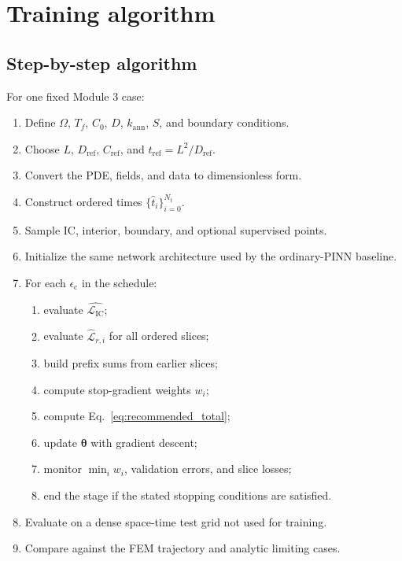 \documentclass[11pt]{article}
\newcommand{\thetav}{\bm{\theta}}
\newcommand{\Lic}{\mathcal{L}_{\mathrm{IC}}}
\newcommand{\Om}{\Omega}
\newcommand{\Dref}{D_{\mathrm{ref}}}
\newcommand{\Cref}{C_{\mathrm{ref}}}
\newcommand{\tref}{t_{\mathrm{ref}}}
\newcommand{\epsc}{\epsilon_{\mathrm{c}}}
\begin{document}
\section{Training algorithm}

\subsection{Step-by-step algorithm}

For one fixed Module 3 case:
\begin{enumerate}[label=\arabic*.]
    \item Define $\Om$, $T_f$, $C_0$, $D$, $k_{\mathrm{ann}}$, $S$, and boundary conditions.
    \item Choose $L$, $\Dref$, $\Cref$, and $\tref=L^2/\Dref$.
    \item Convert the PDE, fields, and data to dimensionless form.
    \item Construct ordered times $\{\hat{t}_i\}_{i=0}^{N_t}$.
    \item Sample IC, interior, boundary, and optional supervised points.
    \item Initialize the same network architecture used by the ordinary-PINN baseline.
    \item For each $\epsc$ in the schedule:
    \begin{enumerate}[label=\alph*.]
        \item evaluate $\widehat{\Lic}$;
        \item evaluate $\widehat{\mathcal{L}}_{r,i}$ for all ordered slices;
        \item build prefix sums from earlier slices;
        \item compute stop-gradient weights $w_i$;
        \item compute Eq.~\eqref{eq:recommended_total};
        \item update $\thetav$ with gradient descent;
        \item monitor $\min_iw_i$, validation errors, and slice losses;
        \item end the stage if the stated stopping conditions are satisfied.
    \end{enumerate}
    \item Evaluate on a dense space-time test grid not used for training.
    \item Compare against the FEM trajectory and analytic limiting cases.
\end{enumerate}
\end{document}
